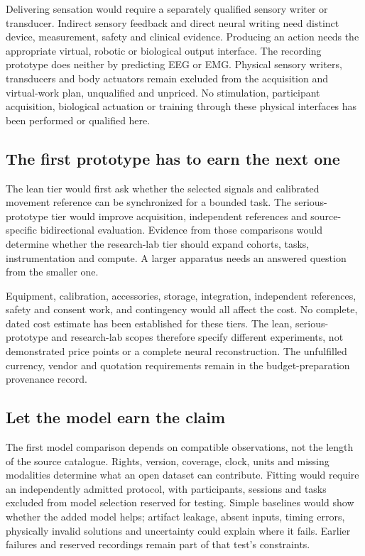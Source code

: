 Delivering sensation would require a separately qualified sensory writer or
transducer. Indirect sensory feedback and direct neural writing need distinct
device, measurement, safety and clinical evidence. Producing an action needs
the appropriate virtual, robotic or biological output interface. The recording
prototype does neither by predicting EEG or EMG. Physical sensory writers,
transducers and body actuators remain excluded from the acquisition and
virtual-work plan, unqualified and unpriced. No stimulation, participant acquisition, biological actuation or training through these physical interfaces has been performed or qualified here.

\subsection{The first prototype has to earn the next one}

The lean tier would first ask whether the selected signals and calibrated
movement reference can be synchronized for a bounded task. The serious-prototype
tier would improve acquisition, independent references and source-specific
bidirectional evaluation. Evidence from those comparisons would determine
whether the research-lab tier should expand cohorts, tasks, instrumentation and
compute. A larger apparatus needs an answered question from the smaller one.

Equipment, calibration, accessories, storage, integration, independent references, safety and consent work, and contingency would all affect the cost. No complete, dated cost estimate has been established for these tiers. The lean, serious-prototype and research-lab scopes therefore specify different experiments, not demonstrated price points or a complete neural reconstruction. The unfulfilled currency, vendor and quotation requirements remain in the budget-preparation provenance record.

\subsection{Let the model earn the claim}

The first model comparison depends on compatible observations, not the
length of the source catalogue. Rights, version, coverage, clock, units and
missing modalities determine what an open dataset can contribute. Fitting
would require an independently admitted protocol, with participants, sessions
and tasks excluded from model selection reserved for testing. Simple baselines
would show whether the added model helps; artifact leakage, absent inputs,
timing errors, physically invalid solutions and uncertainty could explain where
it fails. Earlier failures and reserved recordings remain part of that test's
constraints.

